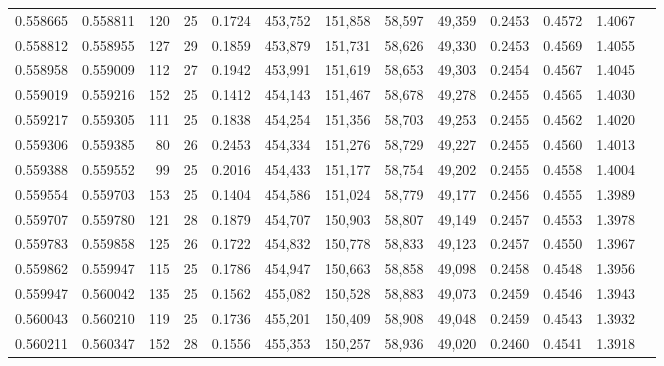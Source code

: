 \begin{tabular}{rrrrrrrrrrrrr}
0.558665 & 0.558811 & 120 &  25 &                                     0.1724 & 453,752 & 151,858 &  58,597 &  49,359 & 0.2453 & 0.4572 & 1.4067 \\
0.558812 & 0.558955 & 127 &  29 &                                     0.1859 & 453,879 & 151,731 &  58,626 &  49,330 & 0.2453 & 0.4569 & 1.4055 \\
0.558958 & 0.559009 & 112 &  27 &                                     0.1942 & 453,991 & 151,619 &  58,653 &  49,303 & 0.2454 & 0.4567 & 1.4045 \\
0.559019 & 0.559216 & 152 &  25 &                                     0.1412 & 454,143 & 151,467 &  58,678 &  49,278 & 0.2455 & 0.4565 & 1.4030 \\
0.559217 & 0.559305 & 111 &  25 &                                     0.1838 & 454,254 & 151,356 &  58,703 &  49,253 & 0.2455 & 0.4562 & 1.4020 \\
0.559306 & 0.559385 &  80 &  26 &                                     0.2453 & 454,334 & 151,276 &  58,729 &  49,227 & 0.2455 & 0.4560 & 1.4013 \\
0.559388 & 0.559552 &  99 &  25 &                                     0.2016 & 454,433 & 151,177 &  58,754 &  49,202 & 0.2455 & 0.4558 & 1.4004 \\
0.559554 & 0.559703 & 153 &  25 &                                     0.1404 & 454,586 & 151,024 &  58,779 &  49,177 & 0.2456 & 0.4555 & 1.3989 \\
0.559707 & 0.559780 & 121 &  28 &                                     0.1879 & 454,707 & 150,903 &  58,807 &  49,149 & 0.2457 & 0.4553 & 1.3978 \\
0.559783 & 0.559858 & 125 &  26 &                                     0.1722 & 454,832 & 150,778 &  58,833 &  49,123 & 0.2457 & 0.4550 & 1.3967 \\
0.559862 & 0.559947 & 115 &  25 &                                     0.1786 & 454,947 & 150,663 &  58,858 &  49,098 & 0.2458 & 0.4548 & 1.3956 \\
0.559947 & 0.560042 & 135 &  25 &                                     0.1562 & 455,082 & 150,528 &  58,883 &  49,073 & 0.2459 & 0.4546 & 1.3943 \\
0.560043 & 0.560210 & 119 &  25 &                                     0.1736 & 455,201 & 150,409 &  58,908 &  49,048 & 0.2459 & 0.4543 & 1.3932 \\
0.560211 & 0.560347 & 152 &  28 &                                     0.1556 & 455,353 & 150,257 &  58,936 &  49,020 & 0.2460 & 0.4541 & 1.3918 \\

\end{tabular}
